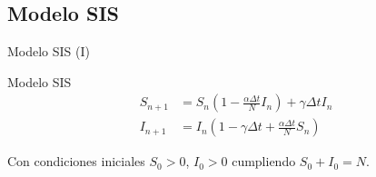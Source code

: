 
          



\subsection{Modelo SIS}


\begin{frame}{Modelo SIS (I)}
    \begin{block}{Modelo SIS}
        \begin{equation}
            \label{eqn: modelo_SIS}
            \begin{aligned}
            S_{n+1} & = S_n \left(1-\frac{\alpha\Delta t}{N} I_n \right) + \gamma \Delta t I_n \\
            I_{n+1} & = I_n \left( 1-\gamma \Delta t + \frac{\alpha\Delta t}{N} S_n \right)
            \end{aligned}
            \end{equation}
            
            Con condiciones iniciales $S_0>0$, $I_0>0$ cumpliendo $S_0+I_0=N$.
    \end{block}
\end{frame}


